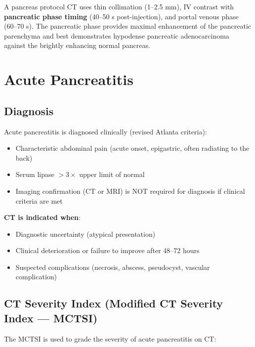 \begin{pearlbox}
A pancreas protocol CT uses thin collimation (1--2.5 mm), IV contrast with \textbf{pancreatic phase timing} (40--50 s post-injection), and portal venous phase (60--70 s). The pancreatic phase provides maximal enhancement of the pancreatic parenchyma and best demonstrates hypodense pancreatic adenocarcinoma against the brightly enhancing normal pancreas.
\end{pearlbox}


\section{Acute Pancreatitis}

\subsection{Diagnosis}
Acute pancreatitis is diagnosed clinically (revised Atlanta criteria):
\begin{itemize}
  \item Characteristic abdominal pain (acute onset, epigastric, often radiating to the back)
  \item Serum lipase $> 3 \times$ upper limit of normal
  \item Imaging confirmation (CT or MRI) is NOT required for diagnosis if clinical criteria are met
\end{itemize}

\textbf{CT is indicated when}:
\begin{itemize}
  \item Diagnostic uncertainty (atypical presentation)
  \item Clinical deterioration or failure to improve after 48--72 hours
  \item Suspected complications (necrosis, abscess, pseudocyst, vascular complication)
\end{itemize}

\subsection{CT Severity Index (Modified CT Severity Index --- MCTSI)}
The MCTSI is used to grade the severity of acute pancreatitis on CT:

